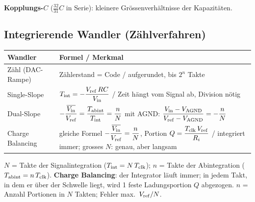 \begin{warnbox}
	\small
\end{warnbox}
\vspace{2pt}
{\centering\resizebox{0.9\columnwidth}{!}{}\par}\vspace{2pt}


\noindent\textbf{Kopplungs-$C$} ($\frac{32}{31}C$ in Serie): kleinere Grössenverhältnisse der Kapazitäten.

\subsection{Integrierende Wandler (Zählverfahren)}\label{sec:integrierend}

{\renewcommand{\arraystretch}{2.3}
\begin{tabularx}{\columnwidth}{@{}l X@{}}
	\toprule
	\textbf{Wandler} & \textbf{Formel \; / \; Merkmal} \\ \midrule
	Zähl (DAC-Rampe) & Zählerstand = Code \; / \; aufgerundet, bis $2^n$ Takte \\
	Single-Slope     & $T_{\rm int} = -\dfrac{V_{\rm ref}\,RC}{V_{\rm in}}$ \; / \; Zeit hängt vom Signal ab, Division nötig \\
	Dual-Slope       & $-\dfrac{\overline{V_{\rm in}}}{V_{\rm ref}} = \dfrac{T_{\rm abint}}{T_{\rm int}} = \dfrac{n}{N}$  \quad mit AGND: $\dfrac{V_{\rm in}-V_{\rm AGND}}{V_{\rm ref}-V_{\rm AGND}} = -\dfrac{n}{N}$ \\
	Charge Balancing & gleiche Formel $-\dfrac{\overline{V_{\rm in}}}{V_{\rm ref}} = \dfrac nN$, Portion $Q = \dfrac{T_{\rm clk}\,V_{\rm ref}}{R_i}$ \; / \; integriert immer; grosses $N$: genau, aber langsam \\ \bottomrule
\end{tabularx}}

\vspace{2pt}
{\small $N$ = Takte der Signalintegration ($T_{\rm int} = N\,T_{\rm clk}$); $n$ = Takte der Abintegration ($T_{\rm abint} = n\,T_{\rm clk}$). \textbf{Charge Balancing}: der Integrator läuft immer; in jedem Takt, in dem er über der Schwelle liegt, wird 1 feste Ladungsportion $Q$ abgezogen. $n$ = Anzahl Portionen in $N$ Takten; Fehler max.\ $V_{\rm ref}/N$.}

